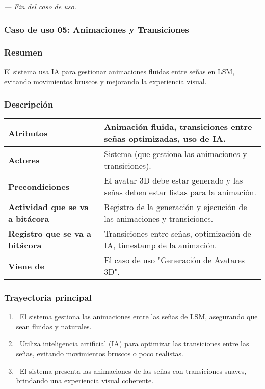 \textit{--- Fin del caso de uso.}
\newpage
\subsubsection{Caso de uso 05: Animaciones y Transiciones}
\subsubsection{Resumen}
El sistema usa IA para gestionar animaciones fluidas entre señas en LSM, evitando movimientos bruscos y mejorando la experiencia visual.
\subsubsection{Descripción}
\begin{table}[h]
    \centering
    \begin{longtable}{|l|p{10cm}|}  %
    \hline
    \textbf{Atributos} & Animación fluida, transiciones entre señas optimizadas, uso de IA. \\ \hline
    \textbf{Actores} & Sistema (que gestiona las animaciones y transiciones). \\ \hline
    \textbf{Precondiciones} & El avatar 3D debe estar generado y las señas deben estar listas para la animación. \\ \hline
    \textbf{Actividad que se va a bitácora} & Registro de la generación y ejecución de las animaciones y transiciones. \\ \hline
    \textbf{Registro que se va a bitácora} & Transiciones entre señas, optimización de IA, timestamp de la animación. \\ \hline
    \textbf{Viene de} & El caso de uso "Generación de Avatares 3D". \\ \hline
      
    \end{longtable}
\end{table}
    
\subsubsection{Trayectoria principal}
\begin{enumerate}[label=\textbf{\arabic*}, leftmargin=1.5cm]
    \item \UCsystem \ El sistema gestiona las animaciones entre las señas de LSM, asegurando que sean fluidas y naturales.
    
    \item \UCsystem \ Utiliza inteligencia artificial (IA) para optimizar las transiciones entre las señas, evitando movimientos bruscos o poco realistas.
    
    \item \UCsystem \ El sistema presenta las animaciones de las señas con transiciones suaves, brindando una experiencia visual coherente.

\end{enumerate}

